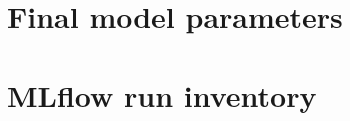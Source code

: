 \section{Final model parameters}

\begin{table}[H]
  \caption{Resolved parameters of the registered champion (from \texttt{model/final\_params.json}).}
\end{table}

\begin{table}[H]
  \caption{Ridge coefficients of the non-spline terms (log-rate change per unit; the trend is per 100 days).}
\end{table}

\section{MLflow run inventory}

\begin{table}[H]
  \caption{Every top-level run behind this report (Optuna trials are nested under \texttt{optuna-search}).}
\end{table}
